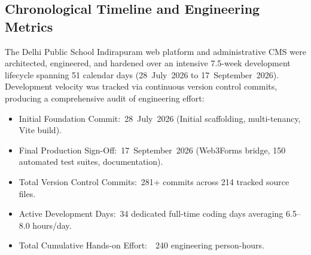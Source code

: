 \documentclass[12pt, a4paper, oneside]{report}
\def\textbf#1{#1}
\def\textasciitilde{~}
\begin{document}
\subsection{Chronological Timeline and Engineering Metrics}

The Delhi Public School Indirapuram web platform and administrative CMS were
architected, engineered, and hardened over an intensive \textbf{7.5-week development
lifecycle} spanning \textbf{51 calendar days} (28~July~2026 to 17~September~2026).
Development velocity was tracked via continuous version control commits, producing
a comprehensive audit of engineering effort:

\begin{itemize}
  \item \textbf{Initial Foundation Commit:}\ 28~July~2026 (Initial scaffolding, multi-tenancy, Vite build).
  \item \textbf{Final Production Sign-Off:}\ 17~September~2026 (Web3Forms bridge, 150 automated test suites, documentation).
  \item \textbf{Total Version Control Commits:}\ \textbf{281+ commits} across \textbf{214 tracked source files}.
  \item \textbf{Active Development Days:}\ \textbf{34 dedicated full-time coding days} averaging 6.5--8.0 hours/day.
  \item \textbf{Total Cumulative Hands-on Effort:}\ \textbf{\textasciitilde240 engineering person-hours}.
\end{itemize}
\end{document}
